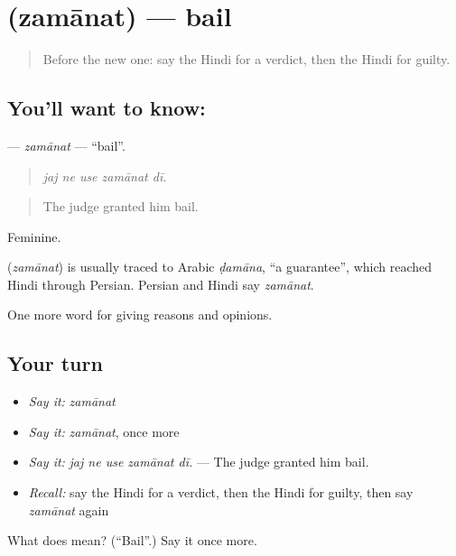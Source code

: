 \section[\texorpdfstring{\hi{ज़मानत} (zamānat)}{ज़मानत (zamānat)}]{ (zamānat) — bail}

\label{lesson:HI-C352-zamanat}



\begin{quote}
Before the new one: say the Hindi for a verdict, then the Hindi for guilty.
\end{quote}

\subsection*{You'll want to know: }
\textbf{} — \emph{zamānat} — \textquotedblleft{}bail\textquotedblright{}.

\begin{quote}
    
\end{quote}

\begin{quote}
\emph{jaj ne use zamānat dī.}
\end{quote}

\begin{quote}
The judge granted him bail.
\end{quote}

Feminine.

\begin{cousinweb}
\textbf{} (\emph{zamānat}) is usually traced to Arabic \emph{ḍamāna}, \textquotedblleft{}a guarantee\textquotedblright{}, which reached Hindi through Persian. Persian and Hindi say \emph{zamānat}.
\end{cousinweb}

\begin{grammarlens}[title={What you've built}]
One more word for giving reasons and opinions.
\end{grammarlens}

\subsection*{Your turn}
\begin{itemize}
\raggedright
  \item \emph{Say it:} \emph{zamānat}
  \item \emph{Say it:} \emph{zamānat}, once more
  \item \emph{Say it:} \emph{jaj ne use zamānat dī.} — The judge granted him bail.
  \item \emph{Recall:} say the Hindi for a verdict, then the Hindi for guilty, then say \emph{zamānat} again
\end{itemize}

\begin{tcolorbox}[breakable,colback=teal!4,colframe=teal!35!black,title={Before you move on}]
What does  mean? (\textquotedblleft{}Bail\textquotedblright{}.) Say it once more.
\end{tcolorbox}
